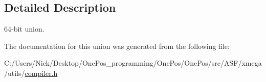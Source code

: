 \subsection{Detailed Description}
64-\/bit union. 

The documentation for this union was generated from the following file\-:\begin{DoxyCompactItemize}
\item 
C\-:/\-Users/\-Nick/\-Desktop/\-One\-Pos\-\_\-programming/\-One\-Pos/\-One\-Pos/src/\-A\-S\-F/xmega/utils/\hyperlink{compiler_8h}{compiler.\-h}\end{DoxyCompactItemize}
